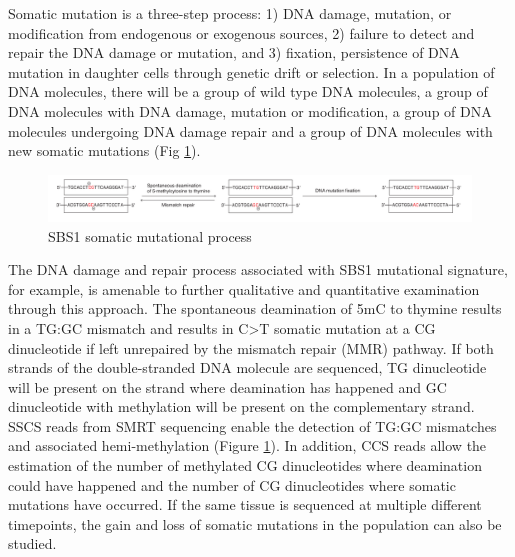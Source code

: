 Somatic mutation is a three-step process: 1) DNA damage, mutation, or modification from endogenous or exogenous sources, 2) failure to detect and repair the DNA damage or mutation, and 3) fixation, persistence of DNA mutation in daughter cells through genetic drift or selection. In a population of DNA molecules, there will be a group of wild type DNA molecules, a group of DNA molecules with DNA damage, mutation or modification, a group of DNA molecules undergoing DNA damage repair and a group of DNA molecules with new somatic mutations (Fig \ref{figure:single-strand-specific-mutation}). 

\begin{figure}[htbp!]
\caption{SBS1 somatic mutational process}
\label{figure:single-strand-specific-mutation}
\begin{centering}
\includegraphics[width=\textwidth]{spontaneous_deamination.pdf} 
\end{centering}
\end{figure}

The DNA damage and repair process associated with SBS1 mutational signature, for example, is amenable to further qualitative and quantitative examination through this approach. The spontaneous deamination of 5mC to thymine results in a TG:GC mismatch and results in C>T somatic mutation at a CG dinucleotide if left unrepaired by the mismatch repair (MMR) pathway. If both strands of the double-stranded DNA molecule are sequenced, TG dinucleotide will be present on the strand where deamination has happened and GC dinucleotide with methylation will be present on the complementary strand. SSCS reads from SMRT sequencing enable the detection of TG:GC mismatches and associated hemi-methylation (Figure \ref{figure:single-strand-specific-mutation}). In addition, CCS reads allow the estimation of the number of methylated CG dinucleotides where deamination could have happened and the number of CG dinucleotides where somatic mutations have occurred. If the same tissue is sequenced at multiple different timepoints, the gain and loss of somatic mutations in the population can also be studied.

